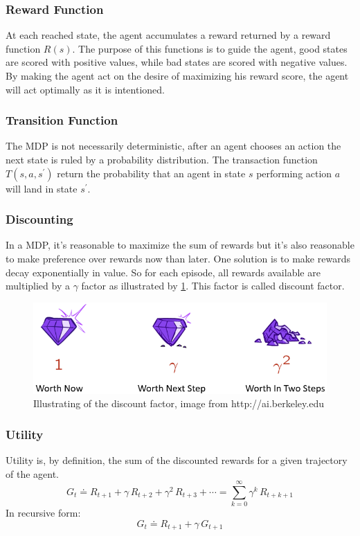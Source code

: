 \subsubsection{Reward Function}
At each reached state, the agent accumulates a reward returned by a reward function $R\left(s\right)$. The purpose of this functions is to guide the agent, good states are scored with positive  values, while bad states are scored with negative values. By making the agent act on the desire of maximizing his reward score, the agent will act optimally as  it is intentioned.


\subsubsection{Transition Function}
The MDP is not necessarily deterministic, after an agent chooses an action the next state is ruled by a probability distribution. The transaction function $ T\left(s, a, s^\prime\right)$ return the probability that an agent in state $s$ performing action $a$ will land in state $s^\prime$.




\subsubsection{Discounting}
In a MDP, it's reasonable to maximize the sum of rewards but it's also reasonable to make preference over rewards now than later. One solution is to make rewards decay exponentially in value. So for each episode, all rewards available are multiplied by a $\gamma$ factor as illustrated by \ref{Discounting}. This factor is called discount factor.

\begin{figure}[h]
	\centering
	\includegraphics[width=1.0\textwidth]{Cap3/Discount}
	\caption{Illustrating of the discount factor, image from http://ai.berkeley.edu}
	\label{Discounting}
\end{figure}



\subsubsection{Utility}
Utility is, by definition,  the sum of the discounted rewards for a given trajectory of the agent.
\begin{equation} \label{Utility}
G_t \doteq R_{t+1} + \gamma\,R_{t+2} + \gamma^{2}\,R_{t+3} + \dotsm = \sum_{k = 0}^{\infty}\gamma^{k}\,R_{t+k+1}
\end{equation}
In recursive form:
\begin{equation} \label{UtilityRec}
G_t \doteq R_{t+1} + \gamma\,G_{t+1}
\end{equation}

